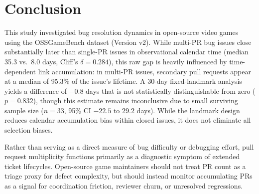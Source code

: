 \section{Conclusion}\label{sec:conclusion}

This study investigated bug resolution dynamics in open-source video games using the OSSGameBench dataset (Version v2). While multi-PR bug issues close substantially later than single-PR issues in observational calendar time (median 35.3 vs.\ 8.0 days, Cliff's $\delta = 0.284$), this raw gap is heavily influenced by time-dependent link accumulation: in multi-PR issues, secondary pull requests appear at a median of 95.3\% of the issue's lifetime. A 30-day fixed-landmark analysis yields a difference of $-0.8$ days that is not statistically distinguishable from zero ($p=0.832$), though this estimate remains inconclusive due to small surviving sample size ($n=33$, 95\% CI $-22.5$ to $29.2$ days). While the landmark design reduces calendar accumulation bias within closed issues, it does not eliminate all selection biases.

Rather than serving as a direct measure of bug difficulty or debugging effort, pull request multiplicity functions primarily as a diagnostic symptom of extended ticket lifecycles. Open-source game maintainers should not treat PR count as a triage proxy for defect complexity, but should instead monitor accumulating PRs as a signal for coordination friction, reviewer churn, or unresolved regressions.
